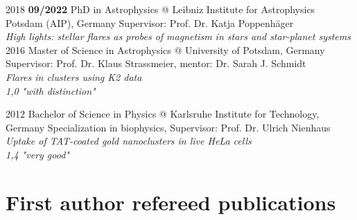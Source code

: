 \documentclass[11pt]{k-cv} %
\begin{document}
\begin{entrylist}
\entry
{2018 \to \textbf{09/2022}}
{PhD {\normalfont in Astrophysics} @ Leibniz Institute for Astrophysics Potsdam (AIP), Germany}
{}
{Supervisor: Prof. Dr. Katja Poppenh\"ager\\
\emph{High lights: stellar flares as probes of magnetism in stars and star-planet systems}\vspace{.3cm}\\}
\entry
{2016 }
{Master {\normalfont of Science in Astrophysics} @ University of Potsdam, Germany}
{}
{Supervisor: Prof. Dr. Klaus Strassmeier, mentor: Dr. Sarah J. Schmidt\\
\emph{Flares in clusters using K2 data}\\ \emph{1,0 "with distinction"}}%


\entry
{2012 }
{Bachelor {\normalfont of Science in Physics} @ Karlsruhe Institute for Technology, Germany}
{}
{Specialization in biophysics, Supervisor: Prof. Dr. Ulrich Nienhaus\\
\emph{Uptake of TAT-coated gold nanoclusters in live HeLa cells}\\
\emph{1,4 "very good"}}
\end{entrylist}



\section{First author refereed publications}

\end{document}
